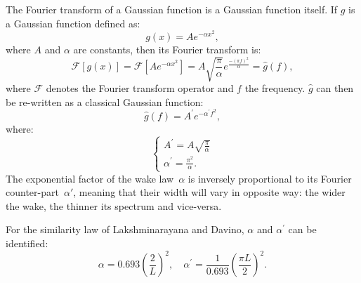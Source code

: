 The Fourier transform of a Gaussian function is a Gaussian function itself.
If $g$ is a Gaussian function defined as:
\begin{equation}
    g(x) = A e^{-\alpha x^2},
    \label{eq:simple_gaussian_function}
\end{equation}
where $A$ and $\alpha$ are constants, then its Fourier transform is:
\begin{equation}
    \mathcal{F} [g(x)] = \mathcal{F} \left[A e^{-\alpha x^2} \right] = 
    A \sqrt{\frac{\pi}{\alpha}}
      e^{\frac{- \left( \pi f \right)^2}{\alpha}} = \widehat{g}(f),
    \label{eq:fourier_transform_gaussian}
\end{equation}
where $\mathcal{F}$ denotes the Fourier transform operator and $f$ the 
frequency.
$\widehat{g}$ can then be re-written as a classical Gaussian function:
\begin{equation}
    \widehat{g}(f) = A^\prime e^{-\alpha^\prime f^2},
    \label{eq:simple_gaussian_function_spectre}
\end{equation}
where:
\begin{equation}
  \begin{cases}
    A^\prime=A \sqrt{\frac{\pi}{\alpha}}\\
    \alpha^\prime = \frac{\pi^2}{\alpha}.
  \end{cases}
\end{equation}
The exponential factor of the wake law~$\alpha$ is inversely
proportional to its Fourier counter-part~$\alpha'$, meaning that their
width will vary in opposite way: the wider the wake, the thinner its
spectrum and vice-versa.

For the similarity law of Lakshminarayana and Davino, $\alpha$ and $\alpha^\prime$ can be identified:
\begin{equation}
    \alpha =  0.693 \left( \frac{2}{L} \right)^2, \quad
    \alpha^\prime =  \frac{1}{0.693} \left( \frac{\pi L}{2} \right)^2.
    \label{eq:gaussian_params_laksh}
\end{equation}

